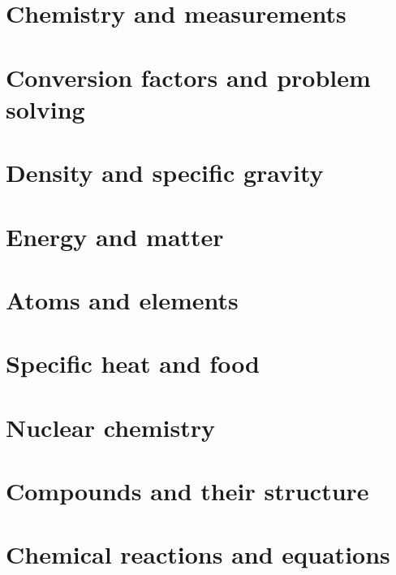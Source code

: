 \newpage\section{ Chemistry and measurements   }\clearpage\mbox{}\clearpage 
 \newpage\section{ Conversion factors and problem solving   }\clearpage\mbox{}\clearpage 
\newpage \section{  Density and specific gravity  }\clearpage\mbox{}\clearpage 
 \newpage\section{ Energy and matter   }\clearpage\mbox{}\clearpage 
   \newpage\section{  Atoms and elements  }\clearpage\mbox{}\clearpage 
 \newpage\section{  Specific heat and food  }\clearpage\mbox{}\clearpage 
 \newpage\section{  Nuclear chemistry  }\clearpage\mbox{}\clearpage 
 \newpage\section{  Compounds and their structure  }\clearpage\mbox{}\clearpage 
  \newpage\section{  Chemical reactions and equations  }\clearpage\mbox{}\clearpage 


